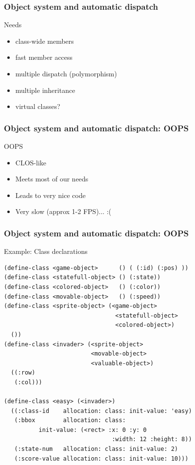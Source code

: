 \documentclass{beamer}
\newcommand{\<}[1]{\`#1}
\begin{document}
\begin{frame}
  \frametitle{Object system and automatic dispatch}

  \begin{block}{Needs}
    \begin{itemize}
    \item class-wide members
    \item fast member access
    \item multiple dispatch (polymorphism)
    \item multiple inheritance
    \item virtual classes?
    \end{itemize}
  \end{block}

\end{frame}

\begin{frame}
  \frametitle{Object system and automatic dispatch: OOPS}

  \begin{block}{OOPS}
    \begin{itemize}
    \item CLOS-like
    \item Meets most of our needs
    \item Leads to very nice code
    \item \alert{Very slow} (approx 1-2 FPS)... :(
    \end{itemize}
  \end{block}

\end{frame}

\begin{frame}[fragile]
  \frametitle{Object system and automatic dispatch: OOPS}

  \begin{block}{Example: Class declarations}
    \begin{lstlisting}[basicstyle=\tiny]
(define-class <game-object>      () ( (:id) (:pos) ))
(define-class <statefull-object> () (:state))
(define-class <colored-object>   () (:color))
(define-class <movable-object>   () (:speed))
(define-class <sprite-object> (<game-object>
                                <statefull-object>
                                <colored-object>)
  ())
(define-class <invader> (<sprite-object>
                         <movable-object>
                         <valuable-object>)
  ((:row)
   (:col)))

(define-class <easy> (<invader>)
  ((:class-id    allocation: class: init-value: 'easy)
   (:bbox        allocation: class: 
          init-value: (<rect> :x: 0 :y: 0
                               :width: 12 :height: 8))
   (:state-num   allocation: class: init-value: 2)
   (:score-value allocation: class: init-value: 10)))
    \end{lstlisting}
  \end{block}

\end{frame}
\end{document}
